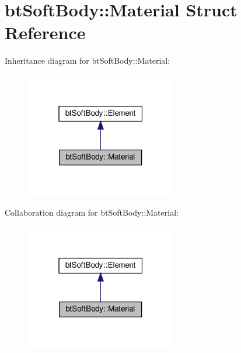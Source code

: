 \hypertarget{structbtSoftBody_1_1Material}{}\section{bt\+Soft\+Body\+:\+:Material Struct Reference}
\label{structbtSoftBody_1_1Material}


Inheritance diagram for bt\+Soft\+Body\+:\+:Material\+:
\nopagebreak
\begin{figure}[H]
\begin{center}
\leavevmode
\includegraphics[width=187pt]{structbtSoftBody_1_1Material__inherit__graph}
\end{center}
\end{figure}


Collaboration diagram for bt\+Soft\+Body\+:\+:Material\+:
\nopagebreak
\begin{figure}[H]
\begin{center}
\leavevmode
\includegraphics[width=187pt]{structbtSoftBody_1_1Material__coll__graph}
\end{center}
\end{figure}
